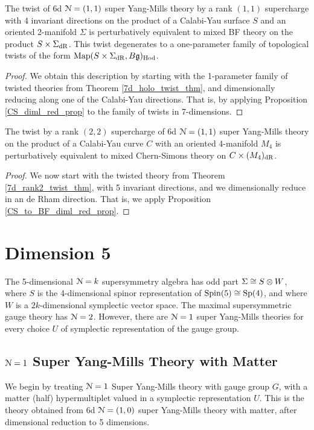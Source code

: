 \documentclass[10pt, oneside]{article}
\begin{document}
\begin{theorem} \label{6d_rk11_twist_thm}
The twist of 6d $\mathcal{N}=(1,1)$ super Yang-Mills theory by a rank $(1,1)$ supercharge with 4 invariant directions on the product of a Calabi-Yau surface $S$ and an oriented 2-manifold $\Sigma$ is perturbatively equivalent to mixed BF theory on the product $S \times \Sigma_{\mathrm{dR}}$. This twist degenerates to a one-parameter family of topological twists of the form $\operatorname{Map}(S \times \Sigma_{\mathrm{dR}}, B\mathfrak{g})_{\mathrm{Hod}}$.
\end{theorem}

\begin{proof}
We obtain this description by starting with the 1-parameter family of twisted theories from Theorem \ref{7d_holo_twist_thm}, and dimensionally reducing along one of the Calabi-Yau directions.  That is, by applying Proposition \ref{CS_diml_red_prop} to the family of twists in 7-dimensions.
\end{proof}

\begin{theorem} \label{6d_rk22_twist_thm}
The twist by a rank $(2,2)$ supercharge of 6d $\mathcal{N}=(1,1)$ super Yang-Mills theory on the product of a Calabi-Yau curve $C$ with an oriented 4-manifold $M_4$ is perturbatively equivalent to mixed Chern-Simons theory on $C \times (M_4)_{\mathrm{dR}}$.
\end{theorem}

\begin{proof}
We now start with the twisted theory from Theorem \ref{7d_rank2_twist_thm}, with 5 invariant directions, and we dimensionally reduce in an de Rham direction.  That is, we apply Proposition \ref{CS_to_BF_diml_red_prop}.
\end{proof}

\section{Dimension 5}
The 5-dimensional $\mathcal{N}=k$ supersymmetry algebra has odd part $\Sigma \cong S \otimes W$, where $S$ is the 4-dimensional spinor representation of $\mathrm{Spin}(5) \cong \mathrm{Sp}(4)$, and where $W$ is a $2k$-dimensional symplectic vector space.  The maximal supersymmetric gauge theory has $\mathcal{N}=2$.  However, there are $\mathcal{N}=1$ super Yang-Mills theories for every choice $U$ of symplectic representation of the gauge group.

\subsection{\texorpdfstring{$\mathcal{N} = 1$}{N=1} Super Yang-Mills Theory with Matter}  \label{5d_1_section}
We begin by treating $\mathcal{N}=1$ Super Yang-Mills theory with gauge group $G$, with a matter (half) hypermultiplet valued in a symplectic representation $U$.  This is the theory obtained from 6d $\mathcal{N}=(1,0)$ super Yang-Mills theory with matter, after dimensional reduction to 5 dimensions.
\end{document}
